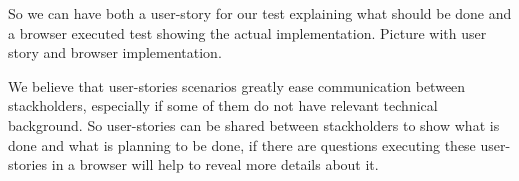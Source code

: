 So we can have both a user-story for our test explaining what should be done and a browser executed test showing the actual implementation. Picture with user story and browser implementation.  

We believe that user-stories scenarios greatly ease communication between stackholders, especially if some of them do not have relevant technical background. So user-stories can be shared between stackholders to show what is done and what is planning to be done, if there are questions executing these user-stories in a browser will help to reveal more details about it. 
   
   
   
    
